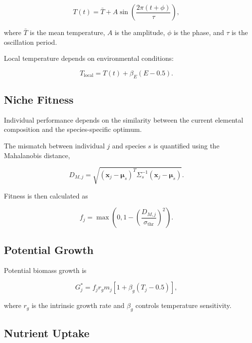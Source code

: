 \begin{equation}
T(t)=\bar T+A\sin\left(\frac{2\pi(t+\phi)}{\tau}\right),
\end{equation}

where $\bar T$ is the mean temperature, $A$ is the amplitude, $\phi$ is the phase, and $\tau$ is the oscillation period.

Local temperature depends on environmental conditions:

\begin{equation}
T_{\mathrm{local}}
=
T(t)+\beta_E(E-0.5).
\end{equation}

\subsection{Niche Fitness}

Individual performance depends on the similarity between the current elemental composition and the species-specific optimum.

The mismatch between individual $j$ and species $s$ is quantified using the Mahalanobis distance,

\begin{equation}
D_{M,j}
=
\sqrt{
(\mathbf{x}_j-\boldsymbol{\mu}_s)^T
\Sigma_s^{-1}
(\mathbf{x}_j-\boldsymbol{\mu}_s)
}.
\end{equation}

Fitness is then calculated as

\begin{equation}
f_j
=
\max
\left(
0,
1-
\left(
\frac{D_{M,j}}
{\sigma_{\mathrm{thr}}}
\right)^2
\right).
\end{equation}

\subsection{Potential Growth}

Potential biomass growth is

\begin{equation}
G_j^\ast
=
f_jr_gm_j
\left[
1+\beta_g(T_j-0.5)
\right],
\end{equation}

where $r_g$ is the intrinsic growth rate and $\beta_g$ controls temperature sensitivity.

\subsection{Nutrient Uptake}

